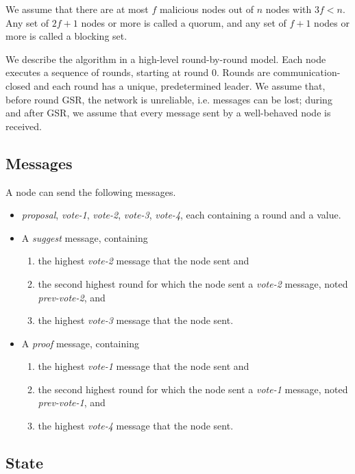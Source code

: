 \documentclass[11pt]{article}
\begin{document}
We assume that there are at most $f$ malicious nodes out of $n$ nodes with $3f<n$.
Any set of $2f+1$ nodes or more is called a quorum, and any set of $f+1$ nodes or more is called a blocking set.

We describe the algorithm in a high-level round-by-round model. Each node executes a
sequence of rounds, starting at round 0. Rounds are communication-closed and
each round has a unique, predetermined leader. We assume that, before round
GSR, the network is unreliable, i.e. messages can be lost; during and after
GSR, we assume that every message sent by a well-behaved node is received.

\subsection{Messages}

A node can send the following messages.
\begin{itemize}
  \item \textit{proposal}, \textit{vote-1}, \textit{vote-2}, \textit{vote-3},
    \textit{vote-4}, each containing a round and a value.
  \item A \textit{suggest} message, containing
    \begin{enumerate}
      \item the highest \textit{vote-2} message that the node sent and
      \item the second highest round for which the node sent a \textit{vote-2}
        message, noted \textit{prev-vote-2}, and
      \item the highest \textit{vote-3} message that the node sent.
    \end{enumerate}
  \item A \textit{proof} message, containing
    \begin{enumerate}
      \item the highest \textit{vote-1} message that the node sent and
      \item the second highest round for which the node sent a \textit{vote-1}
        message, noted \textit{prev-vote-1}, and
      \item the highest \textit{vote-4} message that the node sent.
    \end{enumerate}
\end{itemize}

\subsection{State}
\end{document}
